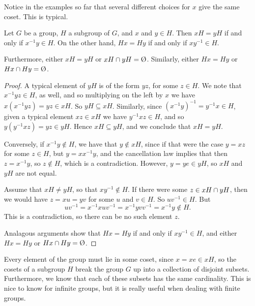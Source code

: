 Notice in the examples so far that several different choices for $x$ 
give the same coset.  This is typical.

\begin{theorem}\label{thm:cosetsequal}
  Let $G$ be a group, $H$ a subgroup of $G$, and $x$ and $y \in H$.  Then 
  $xH = yH$ if and only if $x^{-1}y \in H$.  On the other hand, $Hx = 
  Hy$ if and only if $xy^{-1} \in H$.
  
  Furthermore, either $xH = yH$ or $xH \intersect yH = \emptyset$.  
  Similarly, either $Hx = Hy$ or $Hx \intersect Hy = \emptyset$.
\end{theorem}
\begin{proof}
  A typical element of $yH$ is of the form $yz$, for some $z \in H$. 
  We note that $x^{-1}yz \in H$, as well, and so multiplying on the
  left by $x$ we have $x(x^{-1}yz) = yz \in xH$.  So $yH \subseteq
  xH$.  Similarly, since $(x^{-1}y)^{-1} = y^{-1}x \in H$, given a
  typical element $xz \in xH$ we have $y^{-1}xz \in H$, and so 
  $y(y^{-1}xz) = yz \in yH$.  Hence $xH \subseteq yH$, and we 
  conclude that $xH = yH$.
  
  Conversely, if $x^{-1}y \notin H$, we have that $y \notin xH$, since 
  if that were the case $y = xz$ for some $z \in H$, but $y = 
  xx^{-1}y$, and the cancellation law implies that then $z = 
  x^{-1}y$, so $z \notin H$, which is a contradiction.  However, $y = 
  ye \in yH$, so $xH$ and $yH$ are not equal.
  
  Assume that $xH \ne yH$, so that $xy^{-1} \notin H$.  If there were 
  some $z \in xH \cap yH$, then we would have $z = xu = yv$ for 
  some $u$ and $v \in H$.  So $uv^{-1} \in H$.  But
  \[
    uv^{-1} = x^{-1}xuv^{-1} = x^{-1}yvv^{-1} = x^{-1}y \notin H.
  \]
  This is a contradiction, so there can be no such element $z$.
  
  Analagous arguments show that $Hx = Hy$ if and only if $xy^{-1}
  \in H$, and either $Hx = Hy$ or $Hx \intersect Hy = \emptyset$.
\end{proof}

Every element of the group must lie in some coset, since $x = xe \in 
xH$, so the cosets of a subgroup $H$ break the group $G$ up into a 
collection of disjoint subsets.  Furthermore, we know that each of 
these subsets has the same cardinality.  This is nice to know for 
infinite groups, but it is really useful when dealing with finite 
groups.

